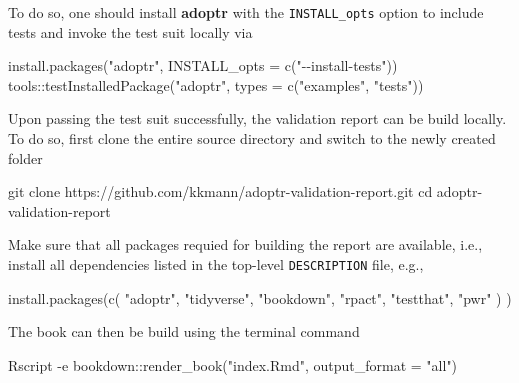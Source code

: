 \documentclass[
]{book}
\newenvironment{Shaded}{\begin{snugshade}}{\end{snugshade}}
\newcommand{\AttributeTok}[1]{\textcolor[rgb]{0.77,0.63,0.00}{#1}}
\newcommand{\BuiltInTok}[1]{#1}
\newcommand{\ExtensionTok}[1]{#1}
\newcommand{\FunctionTok}[1]{\textcolor[rgb]{0.00,0.00,0.00}{#1}}
\newcommand{\NormalTok}[1]{#1}
\newcommand{\SpecialCharTok}[1]{\textcolor[rgb]{0.00,0.00,0.00}{#1}}
\newcommand{\StringTok}[1]{\textcolor[rgb]{0.31,0.60,0.02}{#1}}
\begin{document}
To do so, one should install \textbf{adoptr} with the \texttt{INSTALL\_opts} option
to include tests and invoke the test suit locally via

\begin{Shaded}
\begin{Highlighting}[]
\FunctionTok{install.packages}\NormalTok{(}\StringTok{"adoptr"}\NormalTok{, }\AttributeTok{INSTALL\_opts =} \FunctionTok{c}\NormalTok{(}\StringTok{"{-}{-}install{-}tests"}\NormalTok{))}
\NormalTok{tools}\SpecialCharTok{::}\FunctionTok{testInstalledPackage}\NormalTok{(}\StringTok{"adoptr"}\NormalTok{, }\AttributeTok{types =} \FunctionTok{c}\NormalTok{(}\StringTok{"examples"}\NormalTok{, }\StringTok{"tests"}\NormalTok{))}
\end{Highlighting}
\end{Shaded}

Upon passing the test suit successfully, the validation report
can be build locally.
To do so, first clone the entire source directory and switch
to the newly created folder

\begin{Shaded}
\begin{Highlighting}[]
\FunctionTok{git}\NormalTok{ clone https://github.com/kkmann/adoptr{-}validation{-}report.git}
\BuiltInTok{cd}\NormalTok{ adoptr{-}validation{-}report}
\end{Highlighting}
\end{Shaded}

Make sure that all packages requied for building the report are
available, i.e., install all dependencies listed in the top-level
\texttt{DESCRIPTION} file, e.g.,

\begin{Shaded}
\begin{Highlighting}[]
\FunctionTok{install.packages}\NormalTok{(}\FunctionTok{c}\NormalTok{(}
    \StringTok{"adoptr"}\NormalTok{, }
    \StringTok{"tidyverse"}\NormalTok{, }
    \StringTok{"bookdown"}\NormalTok{, }
    \StringTok{"rpact"}\NormalTok{, }
    \StringTok{"testthat"}\NormalTok{, }
    \StringTok{"pwr"}\NormalTok{ ) )}
\end{Highlighting}
\end{Shaded}

The book can then be build using the terminal command

\begin{Shaded}
\begin{Highlighting}[]
\ExtensionTok{Rscript} \AttributeTok{{-}e} \StringTok{\textquotesingle{}bookdown::render\_book("index.Rmd", output\_format = "all")\textquotesingle{}}
\end{Highlighting}
\end{Shaded}
\end{document}
